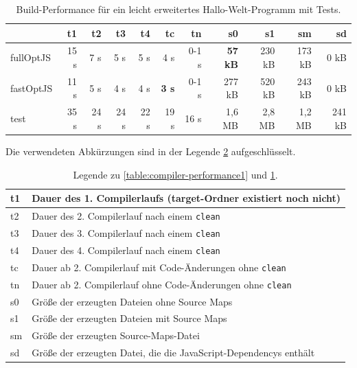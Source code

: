 \documentclass[a4paper, 12pt, hidelinks, listof=totoc, listoftables=totoc, bibliography=totoc]{scrreprt}
\newcommand{\code}[1]{\lstinline[language=Scala, style=inline]|#1|}
\begin{document}
\medskip

\begin{table}[!h]
\begin{tabular}{|l|r|r|r|r|r|r||r|r|r|r|}
\hline           & t1   & t2   & t3   & t4   & tc            & tn    & s0             & s1     & sm     & sd     \\ 
\hline fullOptJS & 15 s &  7 s &  5 s &  5 s &          4 s  & 0-1 s & \textbf{57 kB} & 230 kB & 173 kB &   0 kB \\ 
\hline fastOptJS & 11 s &  5 s &  4 s &  4 s &  \textbf{3 s} & 0-1 s &        277 kB  & 520 kB & 243 kB &   0 kB \\ 
\hline test      & 35 s & 24 s & 24 s & 22 s &         19 s  &  16 s &        1,6 MB  & 2,8 MB & 1,2 MB & 241 kB \\ 
\hline 
\end{tabular} 
\caption{Build-Performance für ein leicht erweitertes Hallo-Welt-Programm mit Tests.}
\label{table:compiler-performance2}
\end{table}

\medskip

Die verwendeten Abkürzungen sind in der Legende \ref{table:compiler-performance-legend} aufgeschlüsselt.

\medskip

\begin{table}[!h]
\begin{tabular}{|l|l|}
\hline t1 & Dauer des 1. Compilerlaufs (target-Ordner existiert noch nicht) \\ 
\hline t2 & Dauer des 2. Compilerlauf nach einem \code{clean} \\ 
\hline t3 & Dauer des 3. Compilerlauf nach einem \code{clean} \\ 
\hline t4 & Dauer des 4. Compilerlauf nach einem \code{clean} \\ 
\hline tc & Dauer ab 2. Compilerlauf mit Code-Änderungen ohne \code{clean} \\ 
\hline tn & Dauer ab 2. Compilerlauf ohne Code-Änderungen ohne \code{clean} \\ 
\hline s0 & Größe der erzeugten Dateien ohne Source Maps \\ 
\hline s1 & Größe der erzeugten Dateien mit Source Maps \\ 
\hline sm & Größe der erzeugten Source-Maps-Datei \\ 
\hline sd & Größe der erzeugten Datei, die die JavaScript-Dependencys enthält \\ 
\hline 
\end{tabular} 
\caption{Legende zu \ref{table:compiler-performance1} und \ref{table:compiler-performance2}.}
\label{table:compiler-performance-legend}
\end{table}
\end{document}
